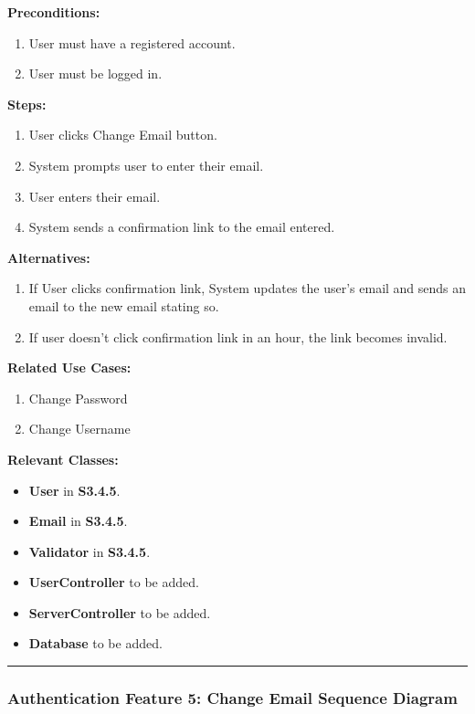 \documentclass[twoside,letterpaper]{article}
\begin{document}
\noindent\textbf{Preconditions:}
\begin{enumerate}
	\item User must have a registered account.
	\item User must be logged in.
\end{enumerate}

\noindent\textbf{Steps:}
\begin{enumerate}
	\item User clicks Change Email button.
	\item System prompts user to enter their email.
	\item User enters their email.
	\item System sends a confirmation link to the email entered.
\end{enumerate}

\noindent\textbf{Alternatives:}
\begin{enumerate}
	\item If User clicks confirmation link, System updates the user's email and sends an email to the new email stating so.
	\item If user doesn't click confirmation link in an hour, the link becomes invalid.
\end{enumerate}

\noindent\textbf{Related Use Cases:}
\begin{enumerate}
	\item Change Password
	\item Change Username
\end{enumerate}

\noindent\textbf{Relevant Classes:}
\begin{itemize}
	\item \textbf{User} in \textbf{S3.4.5}.
	\item \textbf{Email} in \textbf{S3.4.5}.
	\item \textbf{Validator} in \textbf{S3.4.5}.
	\item \textbf{UserController} to be added.
	\item \textbf{ServerController} to be added.
	\item \textbf{Database} to be added.
\end{itemize}
\vspace{8pt}
\hrule
\newpage

\subsubsection[Authentication Feature 5: Change Email Sequence Diagram]{\rmfamily\bfseries\color{black}
	Authentication Feature 5: Change Email Sequence Diagram}
\hypertarget{RefHeading22059017292}{}
\end{document}

